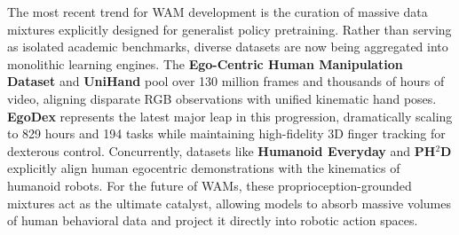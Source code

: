 The most recent trend for WAM development is the curation of massive data mixtures explicitly designed for generalist policy pretraining. Rather than serving as isolated academic benchmarks, diverse datasets are now being aggregated into monolithic learning engines. The \textbf{Ego-Centric Human Manipulation Dataset} \cite{Ego-centric-Human-Manipulation-Dataset} and \textbf{UniHand} \cite{UniHand} pool over 130 million frames and thousands of hours of video, aligning disparate RGB observations with unified kinematic hand poses. \textbf{EgoDex} \cite{EgoDex} represents the latest major leap in this progression, dramatically scaling to 829 hours and 194 tasks while maintaining high-fidelity 3D finger tracking for dexterous control. Concurrently, datasets like \textbf{Humanoid Everyday} \cite{Humanoid_Everyday} and \textbf{PH$^2$D} \cite{Human_Policy} explicitly align human egocentric demonstrations with the kinematics of humanoid robots. For the future of WAMs, these proprioception-grounded mixtures act as the ultimate catalyst, allowing models to absorb massive volumes of human behavioral data and project it directly into robotic action spaces.

